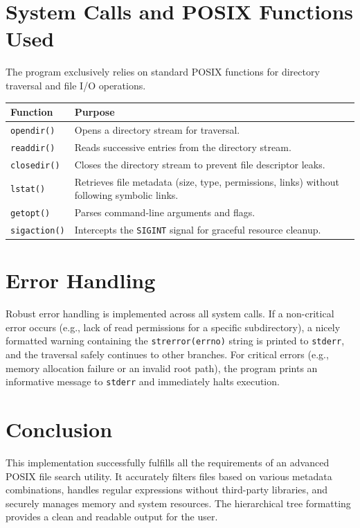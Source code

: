 \documentclass[12pt,a4paper]{article}
\begin{document}
\section{System Calls and POSIX Functions Used}
The program exclusively relies on standard POSIX functions for directory traversal and file I/O operations.
\vspace{0.5cm}

\noindent
\begin{tabularx}{\textwidth}{|l|X|}
\hline
\textbf{Function} & \textbf{Purpose} \\
\hline
\texttt{opendir()} & Opens a directory stream for traversal. \\
\hline
\texttt{readdir()} & Reads successive entries from the directory stream. \\
\hline
\texttt{closedir()} & Closes the directory stream to prevent file descriptor leaks. \\
\hline
\texttt{lstat()} & Retrieves file metadata (size, type, permissions, links) without following symbolic links. \\
\hline
\texttt{getopt()} & Parses command-line arguments and flags. \\
\hline
\texttt{sigaction()} & Intercepts the \texttt{SIGINT} signal for graceful resource cleanup. \\
\hline
\end{tabularx}

\section{Error Handling}
Robust error handling is implemented across all system calls. If a non-critical error occurs (e.g., lack of read permissions for a specific subdirectory), a nicely formatted warning containing the \texttt{strerror(errno)} string is printed to \texttt{stderr}, and the traversal safely continues to other branches. For critical errors (e.g., memory allocation failure or an invalid root path), the program prints an informative message to \texttt{stderr} and immediately halts execution.

\section{Conclusion}
This implementation successfully fulfills all the requirements of an advanced POSIX file search utility. It accurately filters files based on various metadata combinations, handles regular expressions without third-party libraries, and securely manages memory and system resources. The hierarchical tree formatting provides a clean and readable output for the user.
\end{document}
